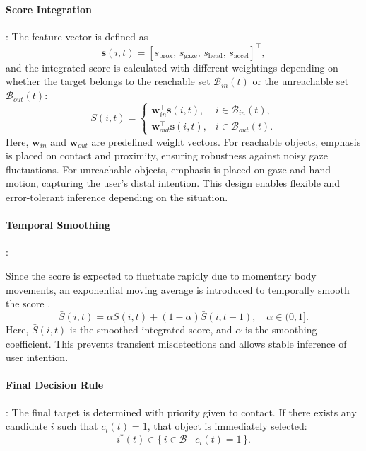 \documentclass[../../main.tex]{subfiles} %
\begin{document}
\paragraph{Score Integration}:  
The feature vector is defined as
\begin{equation}
\mathbf{s}(i,t) = [s_{\text{prox}},\,s_{\text{gaze}},\,s_{\text{head}},\,s_{\text{accel}}]^\top,
\end{equation}
and the integrated score is calculated with different weightings depending on whether 
the target belongs to the reachable set $\mathcal{B}_{in}(t)$  
or the unreachable set $\mathcal{B}_{out}(t)$:
\begin{equation}
S(i,t) =
\begin{cases}
\mathbf{w}_{in}^\top \mathbf{s}(i,t), & i \in \mathcal{B}_{in}(t), \\[6pt]
\mathbf{w}_{out}^\top \mathbf{s}(i,t), & i \in \mathcal{B}_{out}(t).
\end{cases}
\end{equation}
Here, $\mathbf{w}_{in}$ and $\mathbf{w}_{out}$ are predefined weight vectors.  
For reachable objects, emphasis is placed on contact and proximity, 
ensuring robustness against noisy gaze fluctuations.  
For unreachable objects, emphasis is placed on gaze and hand motion, capturing the user’s distal intention.  
This design enables flexible and error-tolerant inference depending on the situation.

\paragraph{Temporal Smoothing}:  

Since the score is expected to fluctuate rapidly due to momentary body 
movements, an exponential moving average is introduced to temporally smooth the score \cite{EMA}.
\begin{equation}
\bar{S}(i,t) = \alpha S(i,t) + (1-\alpha)\bar{S}(i,t-1), \quad \alpha \in (0,1].
\end{equation}
Here, $\bar{S}(i,t)$ is the smoothed integrated score, and $\alpha$ is the smoothing coefficient.  
This prevents transient misdetections and allows stable inference of user intention.

\paragraph{Final Decision Rule}:  
The final target is determined with priority given to contact.  
If there exists any candidate $i$ such that $c_i(t)=1$, 
that object is immediately selected:  
\begin{equation}
i^*(t) \in \{\, i \in \mathcal{B} \mid c_i(t) = 1 \,\}.
\end{equation}
\end{document}
